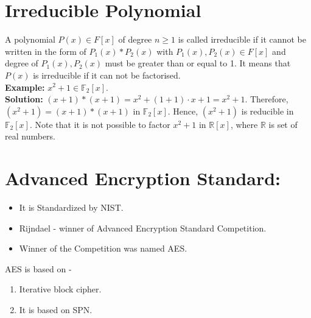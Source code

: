 \documentclass[11pt]{article}
\begin{document}
\section{Irreducible Polynomial}
A polynomial $P(x) \in F[x]$ of degree $n \geq 1$ is called irreducible if it cannot be written in the form of $P_1(x) * P_2(x)$ with $P_1(x), P_2(x) \in F[x]$ and degree of $P_1(x), P_2(x)$ must be greater than or equal to 1. It means that $P(x)$ is irreducible if it can not be factorised.\\
\newline
\textbf{Example:} $x^2 + 1 \in \mathbb{F}_2[x]$.\\
\textbf{Solution:} $(x + 1) * (x + 1) = x^2 + (1 + 1) \cdot x + 1 = x^2 + 1$. Therefore, $(x^2 + 1) =  (x + 1) * (x + 1)$ in $\mathbb{F}_2[x]$. Hence, $(x^2 + 1)$ is reducible in $\mathbb{F}_2[x]$. Note that it is not possible to factor $x^2 + 1$ in $\mathbb{R}[x]$, where $\mathbb{R}$ is set of real numbers.\\


\section{Advanced Encryption Standard:}
\begin{itemize}
    \item It is Standardized by NIST.
    \item Rijndael - winner of Advanced Encryption Standard Competition.
    \item Winner of the Competition was named AES.
\end{itemize}
AES is based on -
\begin{enumerate}
    \item Iterative block cipher.
    \item It is based on SPN.
\end{enumerate}
\end{document}

